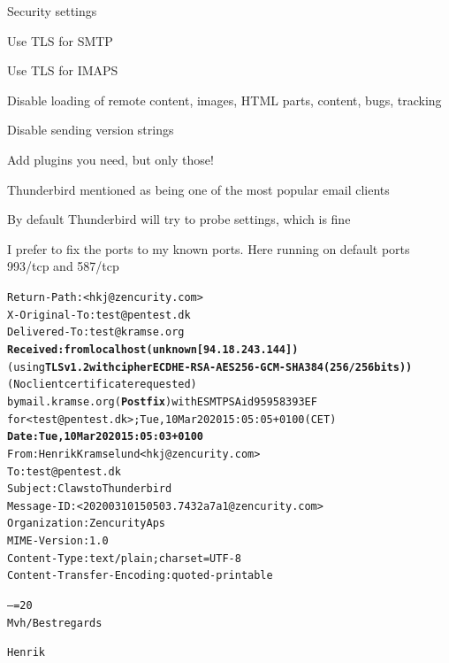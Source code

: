 \documentclass[Screen16to9,17pt]{foils}
\begin{document}


\begin{list2}
\item Security settings
\item Use TLS for SMTP
\item Use TLS for IMAPS
\item Disable loading of remote content, images, HTML parts, content, bugs, tracking
\item Disable sending version strings
\item Add plugins you need, but only those!
\end{list2}

Thunderbird mentioned as being one of the most popular email clients



By default Thunderbird will try to probe settings, which is fine



I prefer to fix the ports to my known ports. Here running on default ports 993/tcp and 587/tcp


\begin{alltt}\footnotesize
Return-Path: <hkj@zencurity.com>
X-Original-To: test@pentest.dk
Delivered-To: test@kramse.org{\bf
Received: from localhost (unknown [94.18.243.144])}
	(using {\bf TLSv1.2 with cipher ECDHE-RSA-AES256-GCM-SHA384 (256/256 bits))}
	(No client certificate requested)
	by mail.kramse.org ({\bf Postfix}) with ESMTPSA id 95958393EF
	for <test@pentest.dk>; Tue, 10 Mar 2020 15:05:05 +0100 (CET){\bf
Date: Tue, 10 Mar 2020 15:05:03 +0100}
From: Henrik Kramselund   <hkj@zencurity.com>
To: test@pentest.dk
Subject: Claws to Thunderbird
Message-ID: <20200310150503.7432a7a1@zencurity.com>
Organization: Zencurity Aps
MIME-Version: 1.0
Content-Type: text/plain; charset=UTF-8
Content-Transfer-Encoding: quoted-printable

--=20
Mvh/Best regards

Henrik
\end{alltt}

\end{document}

